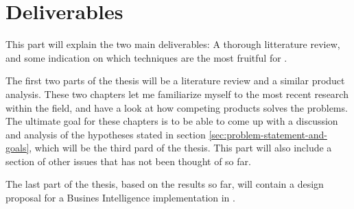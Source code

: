 \section{Deliverables}
\label{sec:Deliverables}
\begin{secex}
This part will explain the two main deliverables: A thorough litterature review, and some indication on which techniques are the most fruitful for \genusSoftware.
\end{secex}
The first two parts of the thesis will be a literature review and a similar product analysis. These two chapters let me familiarize myself to the most recent research within the field, and have a look at how competing products solves the problems. The ultimate goal for these chapters is to be able to come up with a discussion and analysis of the hypotheses stated in section \ref{sec:problem-statement-and-goals}, which will be the third pard of the thesis. This part will also include a section of other issues that has not been thought of so far.

The last part of the thesis, based on the results so far, will contain a design proposal for a Busines Intelligence implementation in \genusSoftware. 
